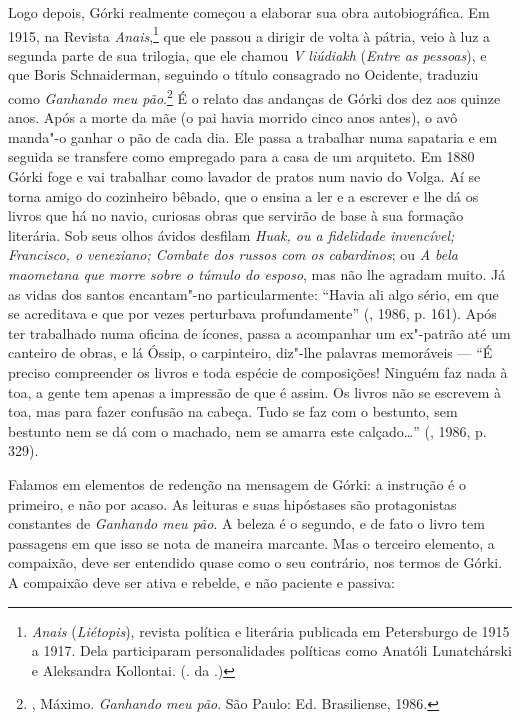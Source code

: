 Logo depois, Górki realmente começou a elaborar sua obra
autobiográfica. Em 1915, na Revista \emph{Anais},\footnote{\emph{Anais}
(\emph{Liétopis}), revista política e literária publicada em
Petersburgo de 1915 a 1917. Dela participaram personalidades
políticas como Anatóli Lunatchárski e Aleksandra Kollontai.
(. da .)} que ele passou a dirigir de volta à
pátria, veio à luz a segunda parte de sua trilogia, que ele
chamou \emph{V liúdiakh} (\emph{Entre as pessoas}), e que Boris
Schnaiderman, seguindo o título consagrado no Ocidente, traduziu
como \emph{Ganhando meu pão}.\footnote{, Máximo.
\emph{Ganhando meu pão}. São Paulo: Ed. Brasiliense, 1986.} É
o relato das andanças de Górki dos dez aos quinze anos. Após a
morte da mãe (o pai havia morrido cinco anos antes), o avô
manda"-o ganhar o pão de cada dia. Ele passa a trabalhar
numa sapataria e em seguida se transfere como empregado para
a casa de um arquiteto. Em 1880 Górki foge e vai trabalhar como
lavador de pratos num navio do Volga. Aí se torna amigo do
cozinheiro bêbado, que o ensina a ler e a escrever e lhe dá os
livros que há no navio, curiosas obras que
servirão de base à sua formação literária. Sob seus olhos ávidos
desfilam \emph{Huak, ou a fidelidade invencível; Francisco, o veneziano;
Combate dos russos com os cabardinos}; ou \emph{A bela maometana que morre
sobre o túmulo do esposo}, mas não lhe agradam muito. Já as vidas
dos santos encantam"-no particularmente: ``Havia ali algo sério,
em que se acreditava e que por vezes perturbava
profundamente'' (, 1986, p. 161). Após ter
trabalhado numa oficina de ícones, passa a acompanhar um
ex"-patrão até um canteiro de obras, e lá Óssip, o carpinteiro,
diz"-lhe palavras memoráveis --- ``É preciso compreender os
livros e toda espécie de composições! Ninguém faz nada à toa,
a gente tem apenas a impressão de que é assim. Os livros não se
escrevem à toa, mas para fazer confusão na cabeça. Tudo se faz
com o bestunto, sem bestunto nem se dá com o machado, nem se
amarra este calçado\ldots{}'' (, 1986, p. 329).

Falamos em elementos de redenção na mensagem de Górki: a instrução é o primeiro, e não por acaso. As leituras e suas hipóstases são protagonistas constantes de \emph{Ganhando meu pão}. A beleza é o segundo, e de fato o livro tem passagens em que isso se nota de maneira marcante. Mas o terceiro elemento, a compaixão, deve ser entendido quase como o seu contrário, nos termos de Górki. A compaixão deve ser ativa e rebelde, e não paciente e passiva: 

